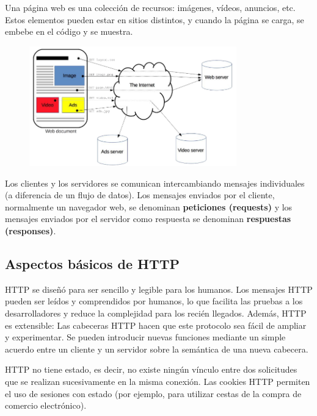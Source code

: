 Una página web es una colección de recursos: imágenes, vídeos, anuncios, etc. Estos elementos pueden estar en sitios distintos, y cuando la página se carga, se embebe en el código y se muestra.
\begin{figure}[htbp]
\centering
\includegraphics[width = 0.8\textwidth]{figs/web-http.png}
\end{figure}

Los clientes y los servidores se comunican intercambiando mensajes individuales (a diferencia de un flujo de datos). Los mensajes enviados por el cliente, normalmente un navegador web, se denominan \textbf{peticiones (requests)} y los mensajes enviados por el servidor como respuesta se denominan \textbf{respuestas (responses)}.

\subsection{Aspectos básicos de HTTP}
HTTP se diseñó para ser sencillo y legible para los humanos. Los mensajes HTTP pueden ser leídos y comprendidos por humanos, lo que facilita las pruebas a los desarrolladores y reduce la complejidad para los recién llegados. Además, HTTP es extensible: Las cabeceras HTTP hacen que este protocolo sea fácil de ampliar y experimentar. Se pueden introducir nuevas funciones mediante un simple acuerdo entre un cliente y un servidor sobre la semántica de una nueva cabecera.

HTTP no tiene estado, es decir, no existe ningún vínculo entre dos solicitudes que se realizan sucesivamente en la misma conexión. Las cookies HTTP permiten el uso de sesiones con estado (por ejemplo, para utilizar cestas de la compra de comercio electrónico).

